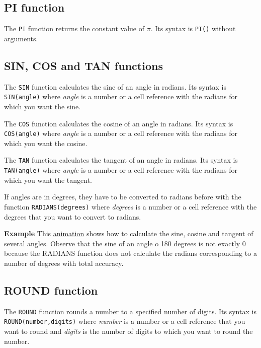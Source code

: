 \subsection{PI function}\hypertarget{pi-function}{}\label{pi-function}

The \texttt{PI} function returns the constant value of $\pi$. Its syntax is \texttt{PI()} without arguments.

\subsection{SIN, COS and TAN functions}\hypertarget{sin-cos-and-tan-functions}{}\label{sin-cos-and-tan-functions}

The \texttt{SIN} function calculates the sine of an angle in radians. Its syntax is \texttt{SIN(angle)} where \emph{angle} is a number or a cell reference with the radians for which you want the sine.

The \texttt{COS} function calculates the cosine of an angle in radians. Its syntax is \texttt{COS(angle)} where \emph{angle} is a number or a cell reference with the radians for which you want the cosine.

The \texttt{TAN} function calculates the tangent of an angle in radians. Its syntax is \texttt{TAN(angle)} where \emph{angle} is a number or a cell reference with the radians for which you want the tangent.

If angles are in degrees, they have to be converted to radians before with the function \texttt{RADIANS(degrees)} where \emph{degrees} is a number or a cell reference with the degrees that you want to convert to radians.

\textbf{Example} This \href{http://aprendeconalf.es/office/excel/manual/img/example_function_sin_cos_tan.gif}{animation} shows how to calculate the sine, cosine and tangent of several angles. Observe that the sine of an angle o 180 degrees is not exactly 0 because the RADIANS function does not calculate the radians corresponding to a number of degrees with total accuracy.

\subsection{ROUND function}\hypertarget{round-function}{}\label{round-function}

The \texttt{ROUND} function rounds a number to a specified number of digits. Its syntax is \texttt{ROUND(number,digits)} where \emph{number} is a number or a cell reference that you want to round and \emph{digits} is the number of digits to which you want to round the number.

